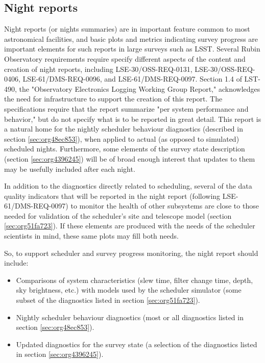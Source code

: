\subsection{Night reports}
\label{sec:orgc076615}
Night reports (or nights summaries) are in important feature common to most astronomical facilities, and basic plots and metrics indicating survey progress are important elements for such reports in large surveys such as LSST.
Several Rubin Observatory requirements require specify different aspects of the content and creation of night reports, including LSE-30/OSS-REQ-0131, LSE-30/OSS-REQ-0406, LSE-61/DMS-REQ-0096, and LSE-61/DMS-REQ-0097. Section 1.4 of LST-490, the "Observatory Electronics Logging Working Group Report," acknowledges the need for infrastructure to support the creation of this report.
The specifications require that the report summarize "per system performance and behavior," but do not specify what is to be reported in great detail.
This report is a natural home for the nightly scheduler behaviour diagnostics (described in section \ref{sec:org48ec853}), when applied to actual (as opposed to simulated) scheduled nights.
Furthermore, some elements of the survey state description (section \ref{sec:org4396245}) will be of broad enough interest that updates to them may be usefully included after each night.

In addition to the diagnostics directly related to scheduling, several of the data quality indicators that will be reported in the night report (following LSE-61/DMS-REQ-0097) to monitor the health of other subsystems are close to those needed for validation of the scheduler's site and telescope model (section \ref{sec:org51fa723}). If these elements are produced with the needs of the scheduler scientists in mind, these same plots may fill both needs.

So, to support scheduler and survey progress monitoring, the night report should include:
\begin{itemize}
\item Comparisons of system characteristics (slew time, filter change time, depth, sky brightness, etc.) with models used by the scheduler simulator (some subset of the diagnostics listed in section \ref{sec:org51fa723}).
\item Nightly scheduler behaviour diagnostics (most or all diagnostics listed in section \ref{sec:org48ec853}).
\item Updated diagnostics for the survey state (a selection of the diagnostics listed in section \ref{sec:org4396245}).
\end{itemize}

